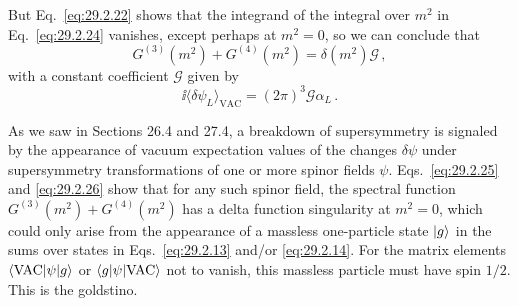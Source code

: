 But Eq.~\eqref{eq:29.2.22} shows that the integrand of the integral over
\(m^2\) in Eq.~\eqref{eq:29.2.24} vanishes, except perhaps at \(m^2=0\),
so we can conclude that
\begin{equation}
  G^{(3)}(m^2)+G^{(4)}(m^2)
  =\delta(m^2)\mathcal{G}\,,
  \tag{29.2.25}\label{eq:29.2.25}
\end{equation}
with a constant coefficient \(\mathcal{G}\) given by
\begin{equation}
  \ii\langle\delta\psi_L\rangle_{\mathrm{VAC}}
  =(2\pi)^3\mathcal{G}\alpha_L\,.
  \tag{29.2.26}\label{eq:29.2.26}
\end{equation}

As we saw in Sections 26.4 and 27.4, a breakdown of supersymmetry is
signaled by the appearance of vacuum expectation values of the changes
\(\delta\psi\) under supersymmetry transformations of one or more spinor
fields \(\psi\). Eqs.~\eqref{eq:29.2.25} and \eqref{eq:29.2.26} show that
for any such spinor field, the spectral function
\(G^{(3)}(m^2)+G^{(4)}(m^2)\) has a delta function singularity at
\(m^2=0\), which could only arise from the appearance of a massless
one-particle state \(\lvert g\rangle\) in the sums over states in
Eqs.~\eqref{eq:29.2.13} and/or \eqref{eq:29.2.14}. For the matrix elements
\(\langle \mathrm{VAC}\rvert\psi\lvert g\rangle\) or
\(\langle g\rvert\psi\lvert \mathrm{VAC}\rangle\) not to vanish, this
massless particle must have spin \(1/2\). This is the goldstino.

